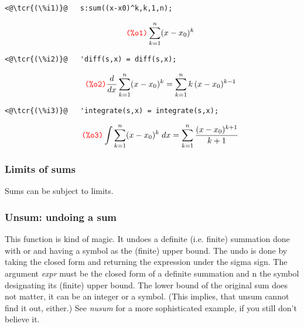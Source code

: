 \documentclass[../Maxima_Workbook.tex]{subfiles}
\begin{document}
\lz \begin{small}
\color{blue} \leqn
\begin{lstlisting}
<@\tcr{(\%i1)}@   s:sum((x-x0)^k,k,1,n);
\end{lstlisting}
\vspace{-4mm} \[\tag*{\tcr{\ttfamily (\%o1)}} \sum_{k=1}^{n} (x-x_0)^k \]
\vspace{-6mm} \begin{lstlisting}
<@\tcr{(\%i2)}@   'diff(s,x) = diff(s,x);
\end{lstlisting}
\vspace{-4mm} \[\tag*{\tcr{\ttfamily (\%o2)}} \frac{d}{dx} \sum_{k=1}^{n} (x-x_0)^k = \sum_{k=1}^{n} k \, (x-x_0)^{k-1} \]
\vspace{-4mm} \begin{lstlisting}
<@\tcr{(\%i3)}@   'integrate(s,x) = integrate(s,x);
\end{lstlisting}
\vspace{-4mm} \[\tag*{\tcr{\ttfamily (\%o3)}} \int \sum_{k=1}^{n} (x-x_0)^k \; dx = \sum_{k=1}^{n} \frac{(x-x_0)^{k+1}}{k+1} \]
\color{black} \reqn
\end{small} \vspace{-3mm}

\subsubsection{Limits of sums}

\lzz Sums can be subject to limits.

\subsubsection{Unsum: undoing a sum}

\lz {} \hfill \tcr{[function]}

\lz This function is kind of magic. It undoes a definite (i.e. finite) summation done with  or  and having a symbol as the (finite) upper bound. The undo is done by taking the closed form and returning the expression under the sigma sign. The argument \emph{expr} must be the closed form of a definite summation and n the symbol designating its (finite) upper bound. The lower bound of the original sum does not matter, it can be an integer or a symbol. (This implies, that unsum cannot find it out, either.) See \emph{nusum} for a more sophisticated example, if you still don't believe it.
\end{document}
